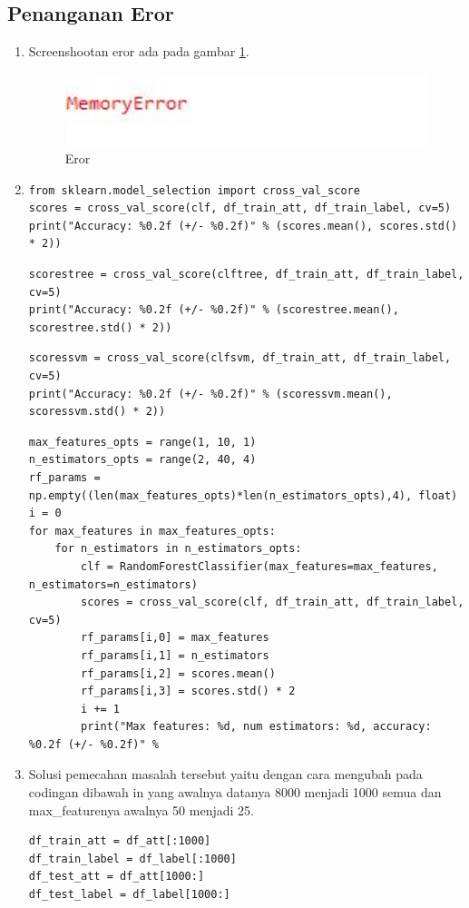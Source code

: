 \subsection{Penanganan Eror}
\begin{enumerate}
\item Screenshootan eror ada pada gambar \ref{h38}.
\begin{figure}[!htbp]
	\centerline{\includegraphics[width=1\textwidth]{figures/huda/chapter3_praktek/eror.JPG}}
	\caption{Eror}
	\label{h38}
\end{figure}
\item 
\begin{verbatim}
from sklearn.model_selection import cross_val_score
scores = cross_val_score(clf, df_train_att, df_train_label, cv=5)
print("Accuracy: %0.2f (+/- %0.2f)" % (scores.mean(), scores.std() * 2))
\end{verbatim}
\subitem 
\begin{verbatim}
scorestree = cross_val_score(clftree, df_train_att, df_train_label, cv=5)
print("Accuracy: %0.2f (+/- %0.2f)" % (scorestree.mean(), scorestree.std() * 2))
\end{verbatim}
\subitem 
\begin{verbatim}
scoressvm = cross_val_score(clfsvm, df_train_att, df_train_label, cv=5)
print("Accuracy: %0.2f (+/- %0.2f)" % (scoressvm.mean(), scoressvm.std() * 2))
\end{verbatim}
\subitem 
\begin{verbatim}
max_features_opts = range(1, 10, 1)
n_estimators_opts = range(2, 40, 4)
rf_params = np.empty((len(max_features_opts)*len(n_estimators_opts),4), float)
i = 0
for max_features in max_features_opts:
    for n_estimators in n_estimators_opts:
        clf = RandomForestClassifier(max_features=max_features, n_estimators=n_estimators)
        scores = cross_val_score(clf, df_train_att, df_train_label, cv=5)
        rf_params[i,0] = max_features
        rf_params[i,1] = n_estimators
        rf_params[i,2] = scores.mean()
        rf_params[i,3] = scores.std() * 2
        i += 1
        print("Max features: %d, num estimators: %d, accuracy: %0.2f (+/- %0.2f)" %
\end{verbatim}
\item Solusi pemecahan masalah tersebut yaitu dengan cara mengubah pada codingan dibawah in yang awalnya datanya 8000 menjadi 1000 semua dan max\_featurenya awalnya 50 menjadi 25.
\subitem 
\begin{verbatim}
df_train_att = df_att[:1000]
df_train_label = df_label[:1000]
df_test_att = df_att[1000:]
df_test_label = df_label[1000:]


\end{verbatim}
\end{enumerate}
